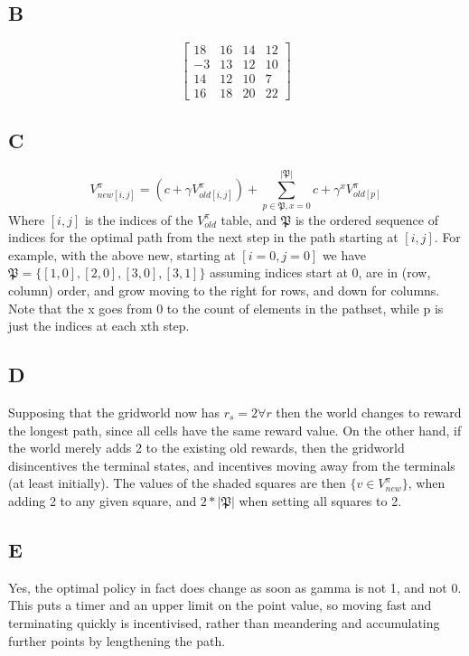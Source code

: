\documentclass{article}
\begin{document}
\subsection{B}
\[
\begin{bmatrix}
	18 & 16 & 14 & 12 \\
	-3 & 13 & 12 & 10 \\
	14 & 12 & 10 & 7 \\
	16 & 18 & 20 & 22
\end{bmatrix}
\]

\subsection{C}
\[
	V^{\pi}_{new[i,j]} = (c +\gamma V^{\pi}_{old[i,j]}) + \displaystyle\sum^{|\mathfrak{P}|}_{p \in \mathfrak{P}, x = 0} c + \gamma^x V^{\pi}_{old[p]}
\]
Where $[i,j]$ is the indices of the $V^{\pi}_{old}$ table, and $\mathfrak{P}$ is the ordered sequence of indices for the optimal path from the next step in the path starting at $[i,j]$.
For example, with the above new, starting at $[i=0,j=0]$ we have $\mathfrak{P}=
\{[1,0], [2,0], [3,0],[3,1]\}$ assuming indices start at 0, are in (row, column)
order, and grow moving to the right for rows, and down for columns.
Note that the x goes from 0 to the count of elements in the pathset, while p is
just the indices at each xth step.

\subsection{D}
Supposing that the gridworld now has $r_s = 2 \forall r$ then the world changes
to reward the longest path, since all cells have the same reward value.
On the other hand, if the world merely adds 2 to the existing old rewards, then 
the gridworld disincentives the terminal states, and incentives moving away
from the terminals (at least initially).
The values of the shaded squares are then $\{v \in V^{\pi}_{new}\}$, when adding 2 to
any given square, and $2*|\mathfrak{P}|$ when setting all squares to 2.

\subsection{E}
Yes, the optimal policy in fact does change as soon as gamma is not 1, and not 0.
This puts a timer and an upper limit on the point value, so moving fast and 
terminating quickly is incentivised, rather than meandering and accumulating 
further points by lengthening the path.
\end{document}
